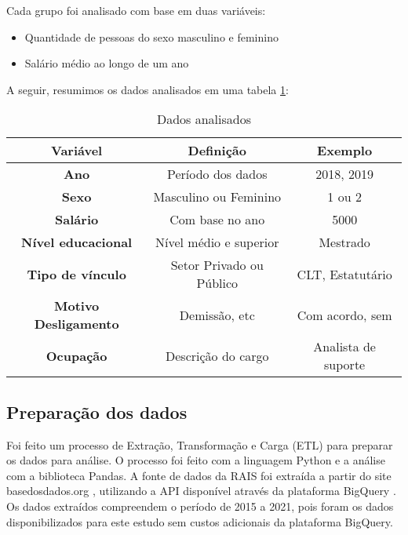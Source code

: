Cada grupo foi analisado com base em duas variáveis:

\begin{itemize}
	\item Quantidade de pessoas do sexo masculino e feminino	      	      	      	      	      
	\item Salário médio ao longo de um ano	    
\end{itemize}
	      	      	      
A seguir, resumimos os dados analisados em uma tabela \ref{vars}:     

\begin{table}[htbp]
	\caption{Dados analisados}
	\begin{center}
		\begin{tabular}{|c|c|c|}
			\hline
			\textbf{Variável}           & \textbf{Definição}      & \textbf{Exemplo}    \\ 
			\hline 
			\textbf{Ano}                 & Período dos dados        & 2018, 2019          \\
			\hline
			\textbf{Sexo}                & Masculino ou Feminino     & 1 ou 2              \\
			\hline
			\textbf{Salário}            & Com base no ano           & 5000                \\
			\hline 
			\textbf{Nível educacional}  & Nível médio e superior  & Mestrado            \\
			\hline 
			\textbf{Tipo de vínculo}    & Setor Privado ou Público & CLT, Estatutário   \\
			\hline 
			\textbf{Motivo Desligamento} & Demissão, etc            & Com acordo, sem     \\
			\hline
			\textbf{Ocupação}          & Descrição do cargo      & Analista de suporte \\
			\hline 
		\end{tabular}
		\label{vars}
	\end{center} 
\end{table}      	      

\subsection{Preparação dos dados}

Foi feito um processo de Extração, Transformação e Carga (ETL) para preparar os dados para análise. O processo foi feito com a linguagem Python e a análise com a biblioteca Pandas. A fonte de dados da RAIS foi extraída a partir do site basedosdados.org \cite{basedosdados}, utilizando a API disponível através da plataforma BigQuery \cite{bigquery}. Os dados extraídos compreendem o período de 2015 a 2021, pois foram os dados disponibilizados para este estudo sem custos adicionais da plataforma BigQuery. 

